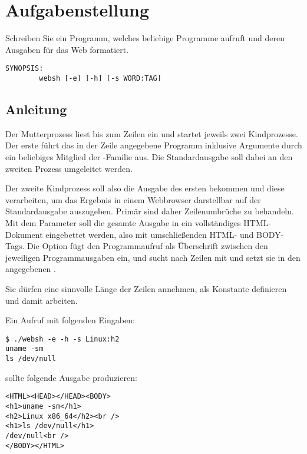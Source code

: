 




\section*{Aufgabenstellung}

Schreiben Sie ein Programm, welches beliebige Programme aufruft und
deren Ausgaben für das Web formatiert.

\begin{verbatim}
SYNOPSIS:
        websh [-e] [-h] [-s WORD:TAG]
\end{verbatim}



\subsection*{Anleitung}

Der Mutterprozess liest bis zum  Zeilen ein und startet
jeweils zwei Kindprozesse. Der erste führt das in der Zeile angegebene
Programm inklusive Argumente durch ein beliebiges Mitglied der
-Familie aus. Die Standardausgabe soll dabei an den zweiten
Prozess umgeleitet werden.

Der zweite Kindprozess soll also die Ausgabe des ersten bekommen und
diese verarbeiten, um das Ergebnis in einem Webbrowser darstellbar auf
der Standardausgabe auszugeben. Primär sind daher Zeilenumbrüche zu
behandeln. Mit dem Parameter  soll die gesamte Ausgabe in ein
vollständiges HTML-Dokument eingebettet werden, also mit
umschließenden HTML- und BODY-Tags. Die Option  fügt den
Programmaufruf als Überschrift zwischen den jeweiligen
Programmausgaben ein, und  sucht nach Zeilen mit 
und setzt sie in den angegebenen .

Sie dürfen eine sinnvolle Länge der Zeilen annehmen, als Konstante
definieren und damit arbeiten.

Ein Aufruf mit folgenden Eingaben: 

\begin{verbatim}
$ ./websh -e -h -s Linux:h2
uname -sm
ls /dev/null
\end{verbatim}

sollte folgende Ausgabe produzieren:

\begin{verbatim}
<HTML><HEAD></HEAD><BODY>
<h1>uname -sm</h1>
<h2>Linux x86_64</h2><br />
<h1>ls /dev/null</h1>
/dev/null<br />
</BODY></HTML> 
\end{verbatim}

\osueguidelinestwo


